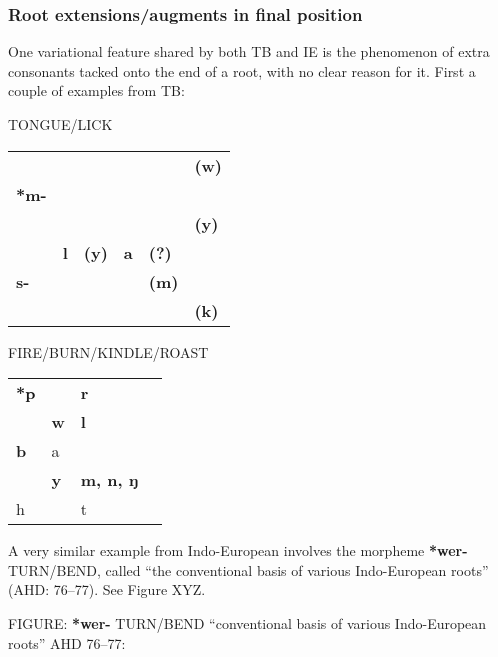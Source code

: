 	
\subsubsection{Root extensions/augments in final position}
One variational feature shared by both TB and IE is the phenomenon of extra consonants tacked onto the end of a root, with no clear reason for it. First a couple of examples from TB:

		
TONGUE/LICK
\begin{tabular}{l l l l l l}
 & & & & & \textbf{(w)}\\
\textbf{*m-} & & & & & \\
 & & & & & \textbf{(y)}\\
 & \textbf{l} & \textbf{(y)} & \textbf{a} & \textbf{(?)} & \\	
\textbf{s-} & & & & \textbf{(m)}\\
 & & & & & \textbf{(k)}\\
\end{tabular}



FIRE/BURN/KINDLE/ROAST

\begin{tabular}{l l l l}
\textbf{*p} & & \textbf{r}\\
 & \textbf{w} & \textbf{l}\\
\textbf{b} & a & \\	
 & \textbf{y} & \textbf{m, n, ŋ}\\	
h & & t\\
\end{tabular}

A very similar example from Indo-European involves the morpheme \textbf{*wer-} TURN/BEND, called “the conventional basis of various Indo-European roots” (AHD: 76–77). See Figure XYZ.

FIGURE: \textbf{*wer-} TURN/BEND  “conventional basis of various Indo-European roots”  AHD 76–77:

